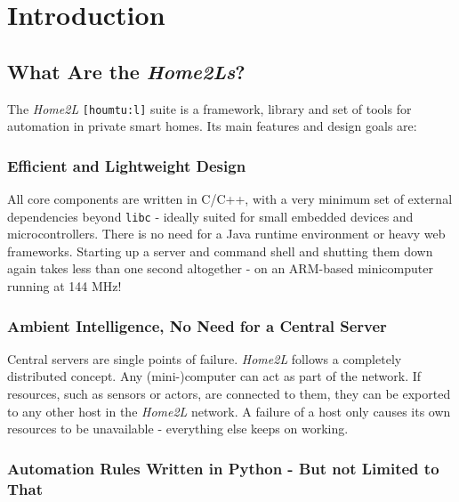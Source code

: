\documentclass[12pt,english,parskip=half]{scrreprt}
\begin{document}
%
%
\chapter{Introduction}
\label{ch:intro}
%
%



\section{What Are the \emph{Home2Ls}?}
\label{sec:intro-overview}


The \emph{Home2L} \texttt{[houmtu:l]} suite is a framework, library and set of tools
for automation in private smart homes. Its main features and design goals are:


\subsection*{Efficient and Lightweight Design}

All core components are written in C/C++, with a very minimum set of external
dependencies beyond \texttt{libc} - ideally suited for small embedded devices and
microcontrollers. There is no need for a Java runtime environment or heavy web
frameworks. Starting up a server and command shell and shutting them down again
takes less than one second altogether - on an ARM-based minicomputer running
at 144 MHz!


\subsection*{Ambient Intelligence, No Need for a Central Server}

Central servers are single points of failure. \emph{Home2L} follows a completely
distributed concept. Any (mini-)computer can act as part of the network. If
resources, such as sensors or actors, are connected to them, they can be
exported to any other host in the \emph{Home2L} network. A failure of a host only
causes its own resources to be unavailable - everything else keeps on working.


\subsection*{Automation Rules Written in Python - But not Limited to That}
\end{document}
